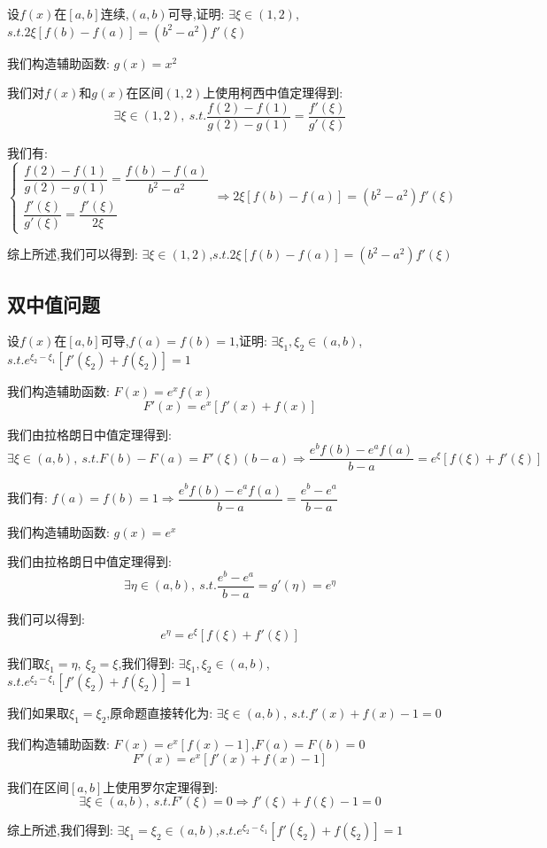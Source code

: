 \begin{proposition}
	设$f(x)$在$[a,b]$连续,$(a,b)$可导,证明: $\exists \xi\in(1,2)$,$s.t. 2\xi[f(b)-f(a)]=(b^2-a^2)f'(\xi)$
\end{proposition}
\begin{solution}

	我们构造辅助函数: $g(x)=x^2$

	我们对$f(x)$和$g(x)$在区间$(1,2)$上使用柯西中值定理得到:
	$$\exists\xi\in(1,2),\ s.t. \dfrac{f(2)-f(1)}{g(2)-g(1)}=\dfrac{f'(\xi)}{g'(\xi)}$$

	我们有:
	$$\left\lbrace
		\begin{array}{l}
			\dfrac{f(2)-f(1)}{g(2)-g(1)}=\dfrac{f(b)-f(a)}{b^2-a^2} \\
			\dfrac{f'(\xi)}{g'(\xi)}=\dfrac{f'(\xi)}{2\xi}
		\end{array}
		\right. \Rightarrow 2\xi[f(b)-f(a)]=(b^2-a^2)f'(\xi)$$

	综上所述,我们可以得到: $\exists \xi\in(1,2)$,$s.t. 2\xi[f(b)-f(a)]=(b^2-a^2)f'(\xi)$
\end{solution}


\subsection{双中值问题}

\begin{proposition}
	设$f(x)$在$[a,b]$可导,$f(a)=f(b)=1$,证明: $\exists \xi_{1},\xi_{2}\in(a,b)$,$s.t. e^{\xi_{2}-\xi_{1}}[f'(\xi_{2})+f(\xi_{2})]=1$
\end{proposition}
\begin{solution}

	我们构造辅助函数: $F(x)=e^xf(x)$
	$$F'(x)=e^x[f'(x)+f(x)]$$

	我们由拉格朗日中值定理得到:
	$$\exists\xi\in(a,b),\ s.t. F(b)-F(a)=F'(\xi)(b-a)\Rightarrow \dfrac{e^bf(b)-e^af(a)}{b-a}=e^{\xi}[f(\xi)+f'(\xi)]$$

	我们有: $f(a)=f(b)=1\Rightarrow \dfrac{e^bf(b)-e^af(a)}{b-a}=\dfrac{e^b-e^a}{b-a}$

	我们构造辅助函数: $g(x)=e^x$

	我们由拉格朗日中值定理得到:
	$$\exists\eta\in(a,b),\ s.t. \dfrac{e^b-e^a}{b-a}=g'(\eta)=e^{\eta}$$

	我们可以得到:
	$$e^{\eta}=e^{\xi}[f(\xi)+f'(\xi)]$$

	我们取$\xi_{1}=\eta,\ \xi_{2}=\xi$,我们得到: $\exists \xi_{1},\xi_{2}\in(a,b)$,$s.t. e^{\xi_{2}-\xi_{1}}[f'(\xi_{2})+f(\xi_{2})]=1$
\end{solution}
\begin{anymark}[注]
	我们如果取$\xi_{1}=\xi_{2}$,原命题直接转化为: $\exists\xi\in(a,b),\ s.t. f'(x)+f(x)-1=0$

	我们构造辅助函数: $F(x)=e^x[f(x)-1]$,$F(a)=F(b)=0$
	$$F'(x)=e^{x}[f'(x)+f(x)-1]$$

	我们在区间$[a,b]$上使用罗尔定理得到:
	$$\exists\xi\in(a,b),\ s.t. F'(\xi)=0\Rightarrow f'(\xi)+f(\xi)-1=0$$

	综上所述,我们得到: $\exists \xi_{1}=\xi_{2}\in(a,b)$,$s.t. e^{\xi_{2}-\xi_{1}}[f'(\xi_{2})+f(\xi_{2})]=1$
\end{anymark}

